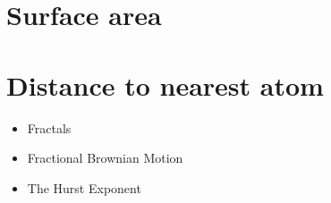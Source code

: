 






\section{Surface area}
\section{Distance to nearest atom}
\begin{itemize}
    \item Fractals
    \item Fractional Brownian Motion
    \item The Hurst Exponent
\end{itemize}


